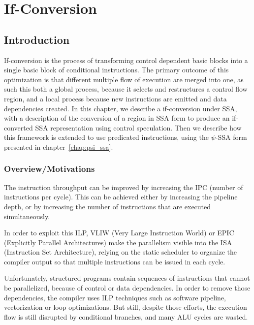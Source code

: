 \chapter{If-Conversion }\label{chap:if_conversion}
\label{chap:if_conv}
\graphicspath{{img/}{if_conversion/img/}{part4/if_conversion/img/}}

\newcommand\cond{~?~}
\newcommand{\annotation}[1]{%
  \marginpar{\small\itshape\color{red}#1}}


\section{Introduction}

If-conversion is the process of transforming control dependent basic blocks into a single basic block of conditional instructions. The primary outcome of this optimization is that different multiple flow of execution are merged into one, as such this both a global process, because it selects and restructures a control flow region, and a local process because new instructions are emitted and data dependencies created.
In this chapter, we describe a if-conversion under SSA, with a description of the conversion of a region in SSA form to produce an if-converted SSA representation using control speculation.
Then we describe how this framework is extended to use predicated instructions, using the $\psi$-SSA form presented in chapter~\ref{chap:psi_ssa}.

\subsection{Overview/Motivations}

The instruction throughput can be improved by increasing the IPC (number of instructions per cycle). This can be achieved either by increasing the pipeline depth, or by increasing the number of instructions that are executed simultaneously.

In order to exploit this ILP, VLIW (Very Large Instruction World) or EPIC (Explicitly Parallel Architectures) make the parallelism visible into the ISA (Instruction Set Architecture), relying on the static scheduler to organize the compiler output so that multiple instructions can be issued in each cycle.

Unfortunately, structured programs contain sequences of instructions that cannot be parallelized, because of control or data dependencies. In order to remove those dependencies, the compiler uses ILP techniques such as software pipeline, vectorization or loop optimizations. But still, despite those efforts, the execution flow is still disrupted by conditional branches, and many ALU cycles are wasted. 

